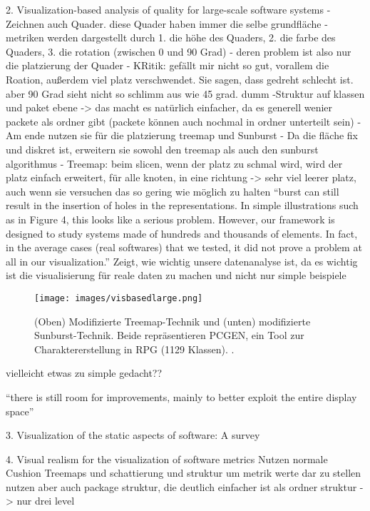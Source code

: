 2. Visualization-based analysis of quality for large-scale software systems \cite{visbasedlarge}
- Zeichnen auch Quader. diese Quader haben immer die selbe grundfläche
- metriken werden dargestellt durch 1. die höhe des Quaders, 2. die farbe des Quaders, 3. die rotation (zwischen 0 und 90 Grad) 
- deren problem ist also nur die platzierung der Quader
- KRitik: gefällt mir nicht so gut, vorallem die Roation, außerdem viel platz verschwendet. Sie sagen, dass gedreht schlecht ist. aber 90 Grad sieht nicht so schlimm aus wie 45 grad. dumm
-Struktur auf klassen und paket ebene -> das macht es natürlich einfacher, da es generell wenier packete als ordner gibt (packete können auch nochmal in ordner unterteilt sein)
- Am ende nutzen sie für die platzierung treemap und Sunburst
- Da die fläche fix und diskret ist, erweitern sie sowohl den treemap als auch den sunburst algorithmus
- Treemap: beim slicen, wenn der platz zu schmal wird, wird der platz einfach erweitert, für alle knoten, in eine richtung -> sehr viel leerer platz, auch wenn sie versuchen das so gering wie möglich zu halten
\enquote{burst can still result in the insertion of holes in the representations. In simple illustrations such as in Figure 4, this looks like a serious problem. However, our framework is designed to study systems made of hundreds and thousands of elements. In fact, in the average cases (real softwares) that we tested, it did not prove a problem at all in our visualization.}
Zeigt, wie wichtig unsere datenanalyse ist, da es wichtig ist die visualisierung für reale daten zu machen und nicht nur simple beispiele

\begin{figure}
    \centering
    \texttt{[image: images/visbasedlarge.png]}
    \caption{(Oben) Modifizierte Treemap-Technik und (unten) modifizierte Sunburst-Technik. Beide repräsentieren PCGEN, ein Tool zur Charaktererstellung in RPG (1129 Klassen). \cite[5]{visbasedlarge}.}
    \label{fig:visbasedlarge}
\end{figure}
vielleicht etwas zu simple gedacht??


\enquote{there is still room for improvements, mainly to better exploit the entire display space}\cite[8]{visbasedlarge}

3. Visualization of the static aspects of software: A survey \cite{staticSurvey}



4. Visual realism for the visualization of software metrics \cite{visRealism}
Nutzen normale Cushion Treemaps und schattierung und struktur um metrik werte dar zu stellen
nutzen aber auch package struktur, die deutlich einfacher ist als ordner struktur -> nur drei level

